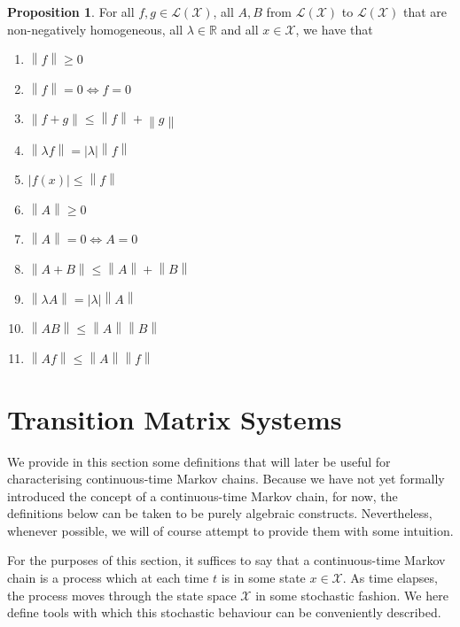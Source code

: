 \documentclass[10pt,a4paper]{paper}
\theoremstyle{definition}
\newtheorem{proposition}[theorem]{Proposition}
\newcommand{\reals}{\mathbb{R}}
\newcommand{\states}{\mathcal{X}}
\newcommand{\gambles}{\mathcal{L}}
\newcommand{\gamblesX}{\gambles(\states)}
\newcommand{\asa}{\Leftrightarrow}
\newcommand{\norm}[1]{\left\lVert #1 \right\rVert}
\newcommand{\abs}[1]{\left\vert #1 \right\vert}
\begin{document}
\begin{proposition}\label{prop:norm_properties}
For all $f,g\in\gamblesX$, all $A,B$ from $\gamblesX$ to $\gamblesX$ that are non-negatively homogeneous, all $\lambda\in\reals$ and all $x\in\states$, we have that
\vspace{5pt}

\begin{multicols}{2}
\begin{enumerate}[label=N\arabic*:,ref=N\arabic*]
\item
$\norm{f}\geq0$
\item
$\norm{f}=0\asa f=0$
\item
$\norm{f+g}\leq\norm{f}+\norm{g}$
\item
$\norm{\lambda f}=\abs{\lambda}\norm{f}$
\item
$\abs{f(x)}\leq\norm{f}$ \\
\item
$\norm{A}\geq0$
\item
$\norm{A}=0\asa A=0$
\item
$\norm{A+B}\leq\norm{A}+\norm{B}$
\item\label{N:homogeneous}
$\norm{\lambda A}=\abs{\lambda}\norm{A}$
\item\label{N:normAB}
$\norm{AB}\leq\norm{A}\norm{B}$
\item\label{N:normAf}
$\norm{Af}\leq\norm{A}\norm{f}$
\end{enumerate}
\end{multicols}
\end{proposition}

\section{Transition Matrix Systems}\label{sec:systems}

We provide in this section some definitions that will later be useful for characterising continuous-time Markov chains. Because we have not yet formally introduced the concept of a continuous-time Markov chain, for now, the definitions below can be taken to be purely algebraic constructs. Nevertheless, whenever possible, we will of course attempt to provide them with some intuition.


For the purposes of this section, it suffices to say that a continuous-time Markov chain is a process which at each time $t$ is in some state $x\in\states$. As time elapses, the process moves through the state space $\states$ in some stochastic fashion. We here define tools with which this stochastic behaviour can be conveniently described.
\end{document}
